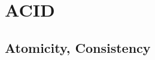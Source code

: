 \documentclass[12pt]{article}
\begin{document}
\section{\ac{ACID}}
\subsection{Atomicity, Consistency}
\begin{comment}

Zagadnienia do rozważenia:
 * możliwość awarii systemu podczas transakcji
 * równoczesny dostęp do danych, równoczesne wykonywanie transakcji

Własności transakcji
 * consistency
    read(A)
    A = A - 50
    write(A)
    read(B)
    B = B + 50
    write(B)
    A + B = const
    na przykład awaria między 3 i 4 powoduje, że baza powróci do stanu pierwotnego
 * trwałość
    zmiany mają charakter trwały
 * izolacja
    transakcje są wykonywane w całowitej izolacji (dla innych transakcji nie są widoczne
    do czasu zatwierdzenia

Stany transakcji:

 active -> partially commited -> commited
 active -> failed
 partially commited -> failed -> aborted

 Gdy nastąpi awaria, to tranakcja zostaje w stanie dowolnym (!)
 Po restarcie SZBD przegląda niedokończone transakcje i doprowadza je do końca

W jaki sposób zapewnić transakcyjność?

 * shadow database: kopiujemy bazę, i po udanej transakcji usuwamy starą bazę i wskaźnik wskazuje na nową
   (izolacja: po kolei)
   - prosta implementacja
   - nieefektywna (kopiowanie _całej_ bazy danych?!)
   - krótkie transakcje czekają na jedną długą

 * algorytmy zapewniające niepodzielność i trwałość
   Metody pozwalające odtworzyć stan bazy w przypadku awarii, powszechnie stosujemy system logów.
   - awarie transakcji:
    * użytkownik - rollback (jawnie)
    * serwer - na przykład naruszenie warunku integralnościowego
   - awarie aplikacji
    * awaria połączenia itp
   - awarie na poziomie serwera baz danych
    * system crash (utrata danych w pamięci)
    * uszkodzenie dysku (utrata danych na dysku)

   1. Akcje podejmowanie podczas normalnego wykonywania się transkcji
   2. Akcje podejmowane po awarii w celu odtworzenia stanu bazy

   INPUT(X) -- blok z dysku zawierający element X jest kopiowany do pamięci
   READ(X, t) -- jeżeli w pamięci nie ma bloku X, to INPUT(X), następnie t := x
   WRITE(X, t) -- jeżeli bloku zwierającego X nie ma w pamięci to INPUT(X), następnie X := t
   OUTPUT(X) -- zawartość bufora kopiowania na dysk


\end{comment}
\end{document}
